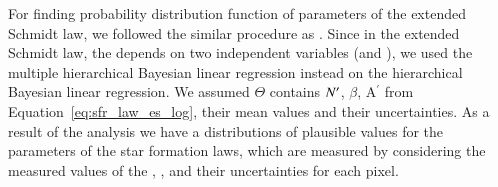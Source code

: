 For finding probability distribution function of parameters of the extended Schmidt law, we followed the similar procedure as \cite{Shetty13}.
Since in the extended Schmidt law, the \sigmasfr depends on two independent variables (\sigmagas and \sigmastar), we used the multiple hierarchical Bayesian linear regression instead on the hierarchical Bayesian linear regression.
We assumed $\Theta$ contains $N^\prime$, $\beta$, A$^\prime$ from Equation~\ref{eq:sfr_law_es_log}, their mean values and their uncertainties. 
As a result of the analysis we have a distributions of plausible values for the parameters of the star formation laws, which are measured by considering the measured values of the \sigmagas, \sigmasfr, \sigmastar and their uncertainties for each pixel.



